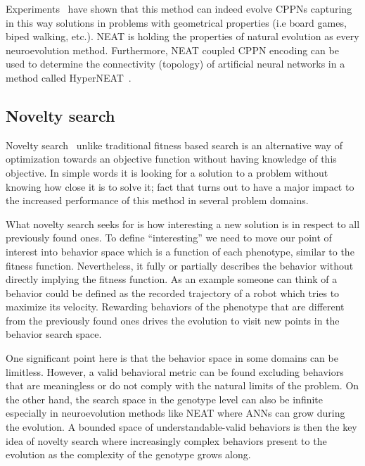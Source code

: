 \documentclass{sig-alternate}
\begin{document}
Experiments~\cite{stanley2007compositional} have shown that this method can indeed evolve CPPNs capturing in this way solutions in problems with geometrical properties (i.e board games, biped walking, etc.). NEAT is holding the properties of natural evolution as every neuroevolution method. Furthermore, NEAT coupled CPPN encoding can be used to determine the connectivity (topology) of artificial neural networks in  a method called HyperNEAT~\cite{stanley2009hypercube}.


\subsection{Novelty search}

Novelty search~\cite{lehman2008exploiting,lehman2011abandoning,lehman2010revising, risi2009novelty} unlike traditional fitness based search is an alternative way of optimization towards an objective function without having knowledge of this objective. In simple words it is looking for a solution to a problem without knowing how close it is to solve it; fact that turns out to have a major impact to the increased performance of this method in several problem domains. 

What novelty search seeks for is how interesting a new solution is in respect to all previously found ones. To define ``interesting'' we need to move our point of interest into behavior space which is a function of each phenotype, similar to the fitness function. Nevertheless, it fully or partially describes the behavior without directly implying the fitness function. As an example someone can think of a behavior could be defined as the recorded trajectory of a robot which tries to maximize its velocity. Rewarding behaviors of the phenotype that are different from the previously found ones drives the evolution to visit new points in the behavior search space.

One significant point here is that the behavior space in some domains can be limitless. However, a valid behavioral metric can be found excluding behaviors that are meaningless or do not comply with the natural limits of the problem. On the other hand, the search space in the genotype level can also be infinite especially in neuroevolution methods like NEAT where ANNs can grow during the evolution. A bounded space of understandable-valid behaviors is then the key idea of novelty search where increasingly complex behaviors present to the evolution as the complexity of the genotype grows along.
\end{document}
